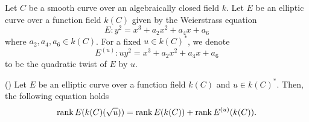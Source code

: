\documentclass[main]{subfiles}
\begin{document}
\begin{dfn}
    Let $C$ be a smooth curve over an algebraically closed field $k$.
    Let $E$ be an elliptic curve over a function field $k(C)$ given by the Weierstrass equation
    \begin{equation}
        E: y^{2} = x^{3} + a_{2} x^{2} + a_{4} x + a_{6}
    \end{equation}
    where $a_{2}, a_{4}, a_{6} \in k(C)$.
    For a fixed $u \in k(C)^*$, we denote
    \begin{equation}
        E^{(u)}: u y^{2} = x^{3} + a_{2} x^{2} + a_{4} x + a_{6}
    \end{equation}
    to be the quadratic twist of $E$ by $u$.
\end{dfn}

\begin{thm}{(\cite[Exercise 10.16]{ref:aec})}
    \label{thm:twist}
    Let $E$ be an elliptic curve over a function field $k(C)$ and $u \in k(C)^*$.
    Then, the following equation holds
    \begin{equation}
        \operatorname{rank} E(k(C)(\sqrt{u})) = \operatorname{rank} E(k(C)) + \operatorname{rank} E^{(u)}(k(C)).
    \end{equation}
\end{thm}
\end{document}
